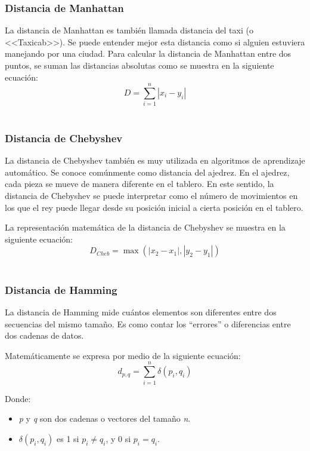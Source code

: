 \documentclass[12pt]{article}
\begin{document}
\subsubsection{Distancia de Manhattan}
La distancia de Manhattan es también llamada distancia del taxi (o <<Taxicab>>). Se puede entender mejor esta distancia
como si alguien estuviera manejando por una ciudad. Para calcular la distancia de Manhattan entre dos puntos, se suman las distancias absolutas como se muestra en la siguiente ecuación:
\begin{equation}
    D = \sum_{i = 1}^{n} |x_i - y_i|
\end{equation}
~\cite{De0a100enIA}

\subsubsection{Distancia de Chebyshev}
La distancia de Chebyshev también es muy utilizada en algoritmos de aprendizaje automático.
Se conoce comúnmente como distancia del ajedrez. En el ajedrez, cada pieza se mueve de manera diferente en el tablero. En este sentido, la
distancia de Chebyshev se puede interpretar como el número de movimientos en los que el rey puede llegar desde su posición inicial a cierta posición en el tablero.

La representación matemática de la distancia de Chebyshev se muestra en la siguiente ecuación:
\begin{equation}
    D_{Cheb} = \max (|x_2 - x_1|, |y_2 - y_1|)
\end{equation}
~\cite{De0a100enIA}

\subsubsection{Distancia de Hamming}
La distancia de Hamming mide cuántos elementos son diferentes entre dos secuencias del mismo tamaño. Es como contar
los “errores” o diferencias entre dos cadenas de datos.

Matemáticamente se expresa por medio de la siguiente ecuación:
\begin{equation}
    d_{p,q} = \sum_{i=1}^{n} \delta(p_i, q_i)
\end{equation}

Donde:
\begin{itemize}
    \item \textit{p} y \textit{q} son dos cadenas o vectores del tamaño \textit{n}.
    \item $\delta(p_i, q_i)$ es 1 si $p_i \neq q_i$, y 0 si $p_i = q_i$.
\end{itemize}
~\cite{De0a100enIA}
\end{document}
